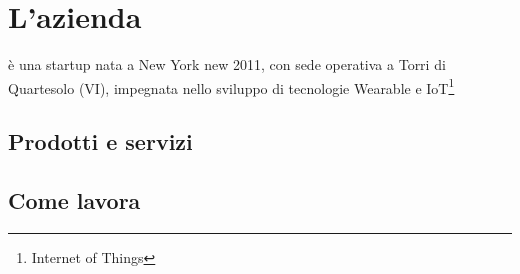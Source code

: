 \chapter{L'azienda\label{cap:lazienda}}
\nomeAziendaComm{} è una startup nata a New York new 2011, con sede operativa a Torri di Quartesolo (VI), impegnata nello sviluppo di tecnologie Wearable e IoT\footnote{Internet of Things}

\section{Prodotti e servizi}

\section{Come lavora}

